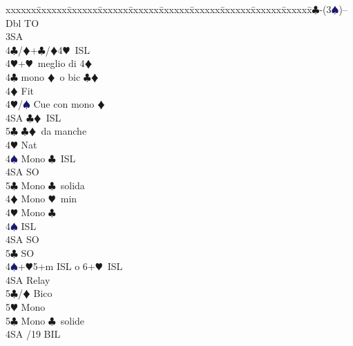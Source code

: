 \documentclass[a4paper,italian]{article}
\newcommand{\BC}{\textcolor{OliveGreen}{$\clubsuit$}}
\newcommand{\BD}{\textcolor{RedOrange}{$\vardiamondsuit$}}
\newcommand{\BH}{\textcolor{Red2}{$\varheartsuit${}}}
\newcommand{\BS}{\textcolor{MidnightBlue}{$\spadesuit${}}}
\newenvironment{bidtable}
{\begin{tabbing}

    xxxxxx\=xxxxxx\=xxxxxx\=xxxxxx\=xxxxxx\=xxxxxx\=xxxxxx\=xxxxxx\=xxxxxx\=xxxxxx\=\kill}
{\end{tabbing} }%
\begin{document}
\begin{multicols}{2}
                                        \columnbreak
                                        \begin{bidtable}
                                            1\BC-(3\BS)--\+\\
                                            Dbl \> TO\+\\
                                            3SA\+\\
                                            4\BC/\BD {}+\BC /\BD 4\BH\ ISL\\
                                            4\BH {}+\BH\ meglio di 4\BD \-\-\\
                                            4\BC \> mono \BD\ o bic \BC \BD \+\\
                                            4\BD \> Fit\+\\
                                            4\BH/\BS \> Cue con mono \BD \\
                                            4SA \> \BC \BD\ ISL\\
                                            5\BC \> \BC \BD\ da manche\-\\
                                            4\BH \> Nat\\
                                            4\BS \> Mono \BC\ ISL\\
                                            4SA \> SO\\
                                            5\BC \> Mono \BC\ solida\-\\
                                            4\BD \> Mono \BH\ min\\
                                            4\BH \> Mono \BC\+\\
                                            4\BS \> ISL\\
                                            4SA \> SO\\
                                            5\BC \> SO\-\\
                                            4\BS {}+\BH 5+m ISL o 6+\BH\ ISL\+\\
                                            4SA \> Relay\+\\
                                            5\BC/\BD \> Bico\\
                                            5\BH \> Mono\-\\
                                            5\BC \> Mono \BC\ solide\-\\
                                            4SA /19 BIL
                                        \end{bidtable}
                                        \begin{tcolorbox}[colframe=azzurro,title={Sviluppi particolari, validi in situazioni analoghe}]


\end{tcolorbox}
\end{multicols}
\end{document}

